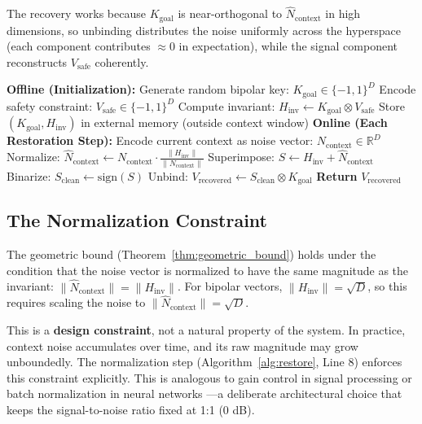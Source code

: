 \documentclass[a4paper,11pt]{article}
\begin{document}
The recovery works because $K_{\text{goal}}$ is near-orthogonal to $\hat{N}_{\text{context}}$ in high dimensions, so unbinding distributes the noise uniformly across the hyperspace (each component contributes $\approx 0$ in expectation), while the signal component reconstructs $V_{\text{safe}}$ coherently.

\begin{algorithm}[H]
\caption{Holographic Invariant Storage: Restoration Protocol}\label{alg:restore}
\begin{algorithmic}[1]
\State \textbf{Offline (Initialization):}
\State Generate random bipolar key: $K_{\text{goal}} \in \{-1,1\}^D$
\State Encode safety constraint: $V_{\text{safe}} \in \{-1,1\}^D$
\State Compute invariant: $H_{\text{inv}} \leftarrow K_{\text{goal}} \otimes V_{\text{safe}}$
\State Store $(K_{\text{goal}}, H_{\text{inv}})$ in external memory (outside context window)
\Statex
\State \textbf{Online (Each Restoration Step):}
\State Encode current context as noise vector: $N_{\text{context}} \in \mathbb{R}^D$
\State Normalize: $\hat{N}_{\text{context}} \leftarrow N_{\text{context}} \cdot \frac{\|H_{\text{inv}}\|}{\|N_{\text{context}}\|}$ 
\State Superimpose: $S \leftarrow H_{\text{inv}} + \hat{N}_{\text{context}}$
\State Binarize: $S_{\text{clean}} \leftarrow \text{sign}(S)$
\State Unbind: $V_{\text{recovered}} \leftarrow S_{\text{clean}} \otimes K_{\text{goal}}$
\State \textbf{Return} $V_{\text{recovered}}$ 
\end{algorithmic}
\end{algorithm}

\subsection{The Normalization Constraint}
\label{sec:normalization}
The geometric bound (Theorem~\ref{thm:geometric_bound}) holds under the condition that the noise vector is normalized to have the same magnitude as the invariant: $\|\hat{N}_{\text{context}}\| = \|H_{\text{inv}}\|$. For bipolar vectors, $\|H_{\text{inv}}\| = \sqrt{D}$, so this requires scaling the noise to $\|\hat{N}_{\text{context}}\| = \sqrt{D}$.

This is a \textbf{design constraint}, not a natural property of the system. In practice, context noise accumulates over time, and its raw magnitude may grow unboundedly. The normalization step (Algorithm~\ref{alg:restore}, Line 8) enforces this constraint explicitly. This is analogous to gain control in signal processing or batch normalization in neural networks \cite{ioffe2015}---a deliberate architectural choice that keeps the signal-to-noise ratio fixed at 1:1 (0 dB).
\end{document}
